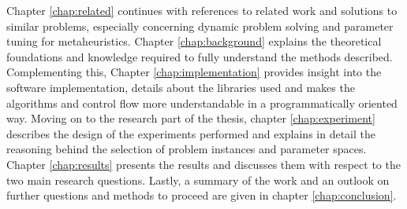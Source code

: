 Chapter \ref{chap:related} continues with references to related work and solutions to similar problems, especially concerning dynamic problem solving and parameter tuning for metaheuristics.
Chapter \ref{chap:background} explains the theoretical foundations and knowledge required to fully understand the methods described.
Complementing this, Chapter \ref{chap:implementation} provides insight into the software implementation, details about the libraries used and makes the algorithms and control flow more understandable in a programmatically oriented way.
Moving on to the research part of the thesis, chapter \ref{chap:experiment} describes the design of the experiments performed and explains in detail the reasoning behind the selection of problem instances and parameter spaces.
Chapter \ref{chap:results} presents the results and discusses them with respect to the two main research questions.
Lastly, a summary of the work and an outlook on further questions and methods to proceed are given in chapter \ref{chap:conclusion}.






